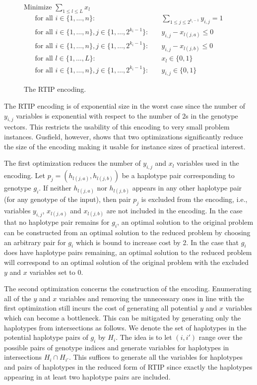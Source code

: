 \documentclass[12pt,a4paper]{article}
\begin{document}
\begin{figure}
\begin{mdframed}
\centering
Minimize $\sum_{1\leq l \leq L} x_l$
\begin{align}
\text{for all  }i\in\{1,\dots , n\}:&\quad \sum_{1\leq j \leq 2^{k_i-1}} y_{i,j} = 1 \\
\text{for all  }i\in\{1,\dots , n\}, j\in\{1,\dots , 2^{k_i-1}\}:& \quad y_{i,j} - x_{l(j,a)}  \leq  0 \\
\text{for all  }i\in\{1,\dots , n\}, j\in\{1,\dots , 2^{k_i-1}\}:&\quad y_{i,j} - x_{l(j,b)}  \leq  0 \\
\text{for all  }l\in\{1,\dots , L\}:&\quad x_l \in \{0,1\} \\
\text{for all  }i\in\{1,\dots , n\}, j\in\{1,\dots , 2^{k_i-1}\}:&\quad y_{i,j} \in \{0,1\} 
\end{align}
\end{mdframed}
\caption{The RTIP encoding.}
\label{fig:enc-rtip}
\end{figure}

The RTIP encoding is of exponential size in the worst case since  the number of $y_{i,j}$ variables is exponential with respect to the number of $2$s in the genotype vectors.
This restricts the usability of this encoding to very small problem instances.
Gusfield, however, shows that two optimizations significantly reduce the size of the encoding making it usable for instance sizes of practical interest.

The first optimization reduces the number of $y_{i,j}$ and $x_l$ variables used in the encoding.
Let $p_j=(h_{l(j,a)}, h_{l(j,b)})$ be a haplotype pair corresponding to genotype $g_i$.
If neither $h_{l(j,a)}$ nor $h_{l(j,b)}$ appears in any other haplotype pair (for any genotype of the input), 
then pair $p_j$ is excluded from the encoding, i.e., 
variables $y_{i,j}$, $x_{l(j,a)}$ and $x_{l(j,b)}$ are not included in the encoding.
In the case that no haplotype pair remains for $g_i$, an optimal solution to the original problem can be constructed from an optimal solution to the reduced problem by choosing an arbitrary pair for $g_i$ which is bound to increase cost by 2.
In the case that $g_i$ does have haplotype pairs remaining, an optimal solution to the reduced problem will correspond to an optimal solution of the original problem with the excluded $y$ and $x$ variables set to $0$.

The second optimization concerns the construction of the encoding.
Enumerating all of the $y$ and $x$ variables and removing the unnecessary ones in line with the first optimization still incurs the cost of generating all potential $y$ and $x$ variables which can become a bottleneck.
This can be mitigated by generating only the haplotypes from intersections as follows.
We denote the set of haplotypes in the potential haplotype pairs of $g_i$ by $H_i$.
The idea is to let $(i,i')$ range over the possible pairs of genotype indices and generate variables for haplotypes in intersections $H_i\cap H_{i'}$.
This suffices to generate all the variables for haplotypes and pairs of haplotypes in the reduced form of RTIP since exactly the haplotypes appearing in at least two haplotype pairs are included.
\end{document}
